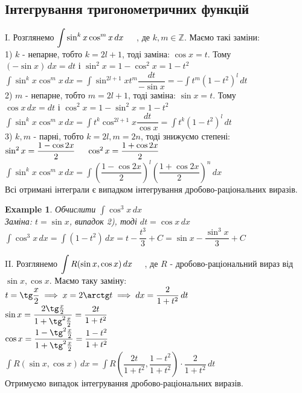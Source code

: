 \documentclass[a4paper, 10pt]{article}
\def\huge{\displaystyle}
\theoremstyle{theoremdd}
\theoremstyle{theoremdd}
\theoremstyle{theoremdd}
\theoremstyle{theoremdd}
\newtheorem{example}[theorem]{Example}
\theoremstyle{theoremdd}
\theoremstyle{theoremdd}
\theoremstyle{theoremdd}
\theoremstyle{theoremdd}
\begin{document}
\subsection{Інтегрування тригонометричних функцій}
I. Розглянемо $\huge \int \sin^k x \cos^m x \,dx \hspace{0.5cm}$, де $k,m \in \mathbb{Z}$. Маємо такі заміни:\\
1) $k$ - непарне, тобто $k = 2l+1$, тоді заміна: $\cos x = t$. Тому\\
$(-\sin x) \,dx = dt$ і $\sin^2 x = 1 - \cos ^2x = 1 - t^2$\\
$\huge \int \sin^k x \cos^m x \,dx = \int \sin^{2l+1} x t^m \dfrac{dt}{-\sin x} = -\int t^m (1-t^2)^l\,dt$
\bigskip \\
2) $m$ - непарне, тобто $m = 2l+1$, тоді заміна: $\sin x = t$. Тому\\
$\cos x \,dx = dt$ і $\cos^2 x = 1 - \sin^2 x = 1 - t^2$\\
$\huge \int \sin^k x \cos^m x \,dx = \int t^k \cos^{2l+1}x \dfrac{dt}{\cos x} = \int t^k(1-t^2)^l \,dt$
\bigskip \\
3) $k,m$ - парні, тобто $k=2l, m =2n$, тоді знижуємо степені: \\ $\sin^2 x = \dfrac{1-\cos 2x}{2} \hspace{0.5cm} \cos^2 x = \dfrac{1+\cos 2x}{2}$\\
$\huge \int \sin^k x \cos^m x \,dx = \int \left( \dfrac{1-\cos 2x}{2} \right)^l \left( \dfrac{1+\cos 2x}{2} \right)^n \,dx$
\bigskip \\
Всі отримані інтеграли є випадком інтегрування дробово-раціональних виразів.

\begin{example}
Обчислити $\huge\int \cos^3 x \,dx$\\
Заміна: $t = \sin x$, випадок 2), тоді $dt = \cos x \,dx$\\
$\huge\int \cos^3 x \,dx = \int (1-t^2)\,dx = t - \dfrac{t^3}{3} + C = \sin x - \dfrac{\sin^3 x}{3} + C$
\end{example}

II. Розглянемо $\huge \int R(\sin x, \cos x)\,dx \hspace{0.5cm}$, де $R$ - дробово-раціональний вираз від $\sin x, \cos x$. Маємо таку заміну:\\
$t = \tg \dfrac{x}{2} \implies x = 2 \arctg t \implies dx = \dfrac{2}{1+t^2}\,dt$\\
$\sin x = \dfrac{2 \tg \frac{x}{2}}{1 + \tg^2 \frac{x}{2}} = \dfrac{2t}{1+t^2}$\\
$\cos x = \dfrac{1 - \tg^2 \frac{x}{2}}{1 + \tg^2 \frac{x}{2}} = \dfrac{1-t^2}{1+t^2}$\\
$\huge \int R(\sin x, \cos x)\,dx = \int R\left(\dfrac{2t}{1+t^2}, \dfrac{1-t^2}{1+t^2} \right) \cdot \dfrac{2}{1+t^2}\,dt$\\
Отримуємо випадок інтегрування дробово-раціональних виразів.
\end{document}
